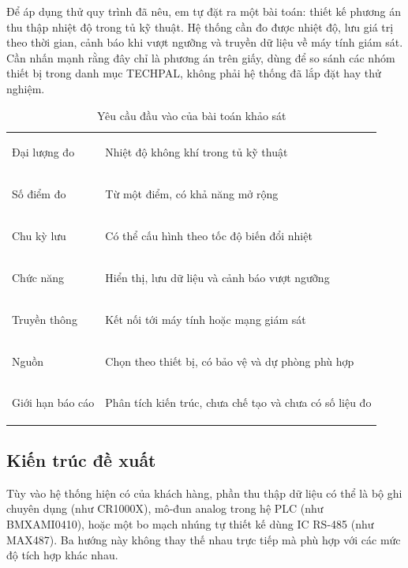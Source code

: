 Để áp dụng thử quy trình đã nêu, em tự đặt ra một bài toán: thiết kế phương án
thu thập nhiệt độ trong tủ kỹ thuật. Hệ thống cần đo được nhiệt độ, lưu giá trị
theo thời gian, cảnh báo khi vượt ngưỡng và truyền dữ liệu về máy tính giám sát.
Cần nhấn mạnh rằng đây chỉ là phương án trên giấy, dùng để so sánh các nhóm
thiết bị trong danh mục TECHPAL, không phải hệ thống đã lắp đặt hay thử nghiệm.

\begin{table}[H]
\centering
\caption{Yêu cầu đầu vào của bài toán khảo sát}
\label{tab:temperature-requirements}
\begin{tabularx}{\textwidth}{>{\bfseries\raggedright\arraybackslash}p{4.3cm} >{\raggedright\arraybackslash}X}
\toprule
Đại lượng đo & Nhiệt độ không khí trong tủ kỹ thuật \\
Số điểm đo & Từ một điểm, có khả năng mở rộng \\
Chu kỳ lưu & Có thể cấu hình theo tốc độ biến đổi nhiệt \\
Chức năng & Hiển thị, lưu dữ liệu và cảnh báo vượt ngưỡng \\
Truyền thông & Kết nối tới máy tính hoặc mạng giám sát \\
Nguồn & Chọn theo thiết bị, có bảo vệ và dự phòng phù hợp \\
Giới hạn báo cáo & Phân tích kiến trúc, chưa chế tạo và chưa có số liệu đo \\
\bottomrule
\end{tabularx}
\end{table}

\subsection{Kiến trúc đề xuất}

Tùy vào hệ thống hiện có của khách hàng, phần thu thập dữ liệu có thể là bộ ghi
chuyên dụng (như CR1000X), mô-đun analog trong hệ PLC (như BMXAMI0410), hoặc một
bo mạch nhúng tự thiết kế dùng IC RS-485 (như MAX487). Ba hướng này không thay
thế nhau trực tiếp mà phù hợp với các mức độ tích hợp khác nhau.

